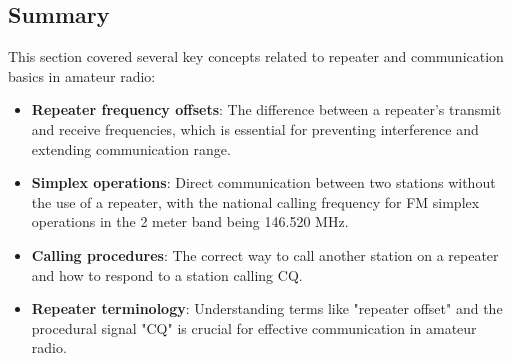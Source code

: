 \subsection*{Summary}
This section covered several key concepts related to repeater and communication basics in amateur radio:
\begin{itemize}
    \item \textbf{Repeater frequency offsets}: The difference between a repeater's transmit and receive frequencies, which is essential for preventing interference and extending communication range.
    \item \textbf{Simplex operations}: Direct communication between two stations without the use of a repeater, with the national calling frequency for FM simplex operations in the 2 meter band being 146.520 MHz.
    \item \textbf{Calling procedures}: The correct way to call another station on a repeater and how to respond to a station calling CQ.
    \item \textbf{Repeater terminology}: Understanding terms like "repeater offset" and the procedural signal "CQ" is crucial for effective communication in amateur radio.
\end{itemize}


